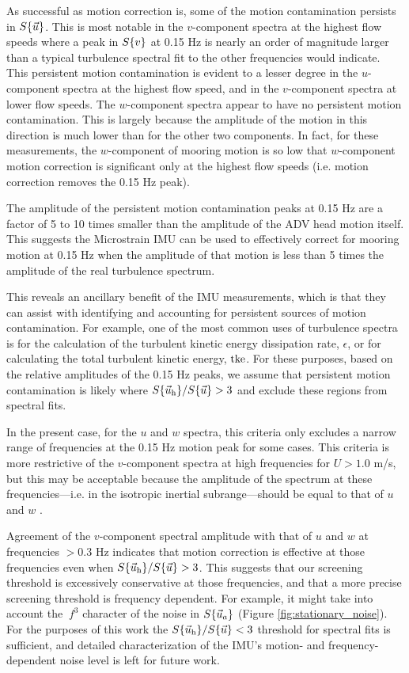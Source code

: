 As successful as motion correction is, some of the motion contamination persists in $S\{\vec{u}\}$. This is most notable in the $v$-component spectra at the highest flow speeds where a peak in $S\{v\}$ at 0.15 Hz is nearly an order of magnitude larger than a typical turbulence spectral fit to the other frequencies would indicate. This persistent motion contamination is evident to a lesser degree in the $u$-component spectra at the highest flow speed, and in the $v$-component spectra at lower flow speeds.  The $w$-component spectra appear to have no persistent motion contamination. This is largely because the amplitude of the motion in this direction is much lower than for the other two components. In fact, for these measurements, the $w$-component of mooring motion is so low that $w$-component motion correction is significant only at the highest flow speeds (i.e. motion correction removes the 0.15 Hz peak).

The amplitude of the persistent motion contamination peaks at 0.15 Hz are a factor of 5 to 10 times smaller than the amplitude of the ADV head motion itself. This suggests the Microstrain IMU can be used to effectively correct for mooring motion at 0.15 Hz when the amplitude of that motion is less than 5 times the amplitude of the real turbulence spectrum.

This reveals an ancillary benefit of the IMU measurements, which is that they can assist with identifying and accounting for persistent sources of motion contamination. For example, one of the most common uses of turbulence spectra is for the calculation of the turbulent kinetic energy dissipation rate, $\epsilon$, or for calculating the total turbulent kinetic energy, $\mathrm{tke}$. For these purposes, based on the relative amplitudes of the 0.15 Hz peaks, we assume that persistent motion contamination is likely where $S\{\vec{u}_\mathrm{h}\}/S\{\vec{u}\} > 3$ and exclude these regions from spectral fits.

In the present case, for the $u$ and $w$ spectra, this criteria only excludes a narrow range of frequencies at the 0.15 Hz motion peak for some cases. This criteria is more restrictive of the $v$-component spectra at high frequencies for $U>1.0$ m/s, but this may be acceptable because the amplitude of the spectrum at these frequencies---i.e. in the isotropic inertial subrange---should be equal to that of $u$ and $w$ \citep[]{Kolmogorov1941c}.

Agreement of the $v$-component spectral amplitude with that of $u$ and $w$ at frequencies $>0.3$ Hz indicates that motion correction is effective at those frequencies even when $S\{\vec{u}_\mathrm{h}\}/S\{\vec{u}\} > 3$. This suggests that our screening threshold is excessively conservative at those frequencies, and that a more precise screening threshold is frequency dependent. For example, it might take into account the $~f^3$ character of the noise in $S\{\vec{u}_a\}$ (Figure \ref{fig:stationary_noise}). For the purposes of this work the $S\{\vec{u}_\mathrm{h}\}/S\{\vec{u}\} < 3$ threshold for spectral fits is sufficient, and detailed characterization of the IMU's motion- and frequency-dependent noise level is left for future work.

